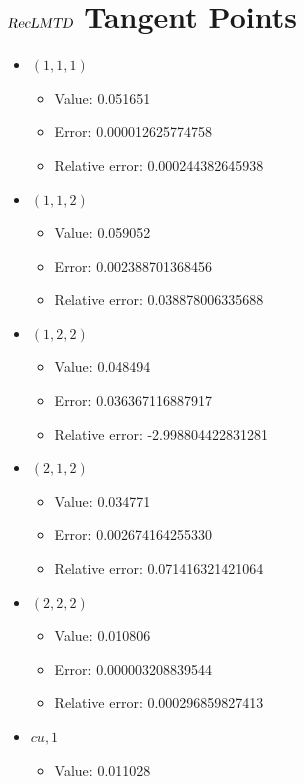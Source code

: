 \documentclass{article}%
\begin{document}
\section{$\textsl{RecLMTD}$ Tangent Points}%
\thispagestyle{plain}%
\begin{itemize}%
	\item $(1, 1, 1)$%
	\begin{itemize}%
		\item Value: 0.051651%
		\item Error: 0.000012625774758%
		\item Relative error: 0.000244382645938%
	\end{itemize}%
	\item $(1, 1, 2)$%
	\begin{itemize}%
		\item Value: 0.059052%
		\item Error: 0.002388701368456%
		\item Relative error: 0.038878006335688%
	\end{itemize}%
	\item $(1, 2, 2)$%
	\begin{itemize}%
		\item Value: 0.048494%
		\item Error: 0.036367116887917%
		\item Relative error: -2.998804422831281%
	\end{itemize}%
	\item $(2, 1, 2)$%
	\begin{itemize}%
		\item Value: 0.034771%
		\item Error: 0.002674164255330%
		\item Relative error: 0.071416321421064%
	\end{itemize}%
	\item $(2, 2, 2)$%
	\begin{itemize}%
		\item Value: 0.010806%
		\item Error: 0.000003208839544%
		\item Relative error: 0.000296859827413%
	\end{itemize}%
	\item $\textit{cu},1$%
	\begin{itemize}%
		\item Value: 0.011028%

\end{itemize}
\end{itemize}
\end{document}

